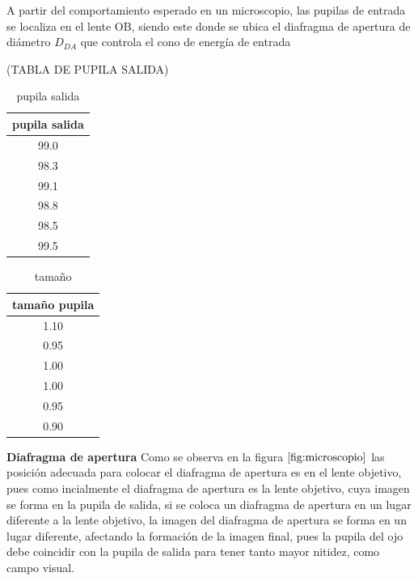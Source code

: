 \documentclass[letterpaper]{article}
\begin{document}
A partir del comportamiento esperado en un microscopio, las pupilas de entrada se localiza en el lente OB, siendo este donde se ubica el diafragma de apertura de diámetro $D_{DA}$ que controla el cono de energía de entrada

(TABLA DE PUPILA SALIDA)
\begin{table}[H]
    \centering
    \begin{tabular}{c}
    \hline
        pupila salida \\ \hline 
            99.0 \\
            98.3\\
            99.1\\
            98.8\\
            98.5\\
            99.5\\
    \end{tabular}
    \caption{pupila salida}
    \label{tab:pupila_salida}
\end{table}

\begin{table}[H]
    \centering
    \begin{tabular}{c}
    \hline
        tamaño pupila \\ \hline 
            1.10    \\
            0.95    \\
            1.00    \\
            1.00    \\
            0.95    \\
            0.90    \\
    \end{tabular}
    \caption{tamaño}
    \label{tab:tamaño_pupila}
\end{table}



\textbf{Diafragma de apertura}
Como se observa en la figura $\ref{fig:microscopio}$ las posición adecuada para colocar el diafragma de apertura es en el lente objetivo, pues como incialmente el diafragma de apertura es la lente objetivo, cuya imagen se forma en la pupila de salida, si se coloca un diafragma de apertura en un lugar diferente a la lente objetivo, la imagen del diafragma de apertura se forma en un lugar diferente, afectando la formación de la imagen final, pues la pupila del ojo debe coincidir con la pupila de salida para tener tanto mayor nitidez, como campo visual.
\end{document}
